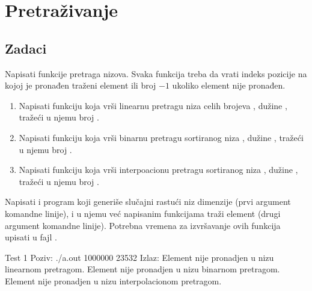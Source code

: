 
\chapter{Pretraživanje}

\section{Zadaci}

\begin{Exercise}[label=401]
  Napisati funkcije pretraga nizova. Svaka funkcija treba da vrati indeks pozicije na kojoj je pronađen traženi element ili broj $-1$ ukoliko element nije pronađen.
  \begin{enumerate}  
  \item Napisati funkciju koja vrši linearnu pretragu niza 
    celih brojeva , dužine , tražeći u njemu broj
    .  
  \item Napisati funkciju koja vrši binarnu pretragu
    sortiranog niza , dužine , tražeći u njemu broj .
  \item Napisati funkciju koja vrši interpoacionu pretragu
    sortiranog niza , dužine , tražeći u njemu broj .
  \end{enumerate}
  Napisati i program koji generiše slučajni rastući niz dimenzije
   (prvi argument komandne linije), i u njemu već napisanim
  funkcijama traži element  (drugi argument komandne
  linije). Potrebna vremena za izvršavanje ovih funkcija upisati u
  fajl .
  
\begin{maxitest}
\begin{test}{Test 1}
Poziv: ./a.out 1000000 23532
Izlaz: Element nije pronadjen u nizu linearnom pretragom.
       Element nije pronadjen u nizu binarnom pretragom.
       Element nije pronadjen u nizu interpolacionom pretragom.  
\end{test}
\end{maxitest}
  
\end{Exercise}

\begin{Answer}[ref=401]
\end{Answer}

